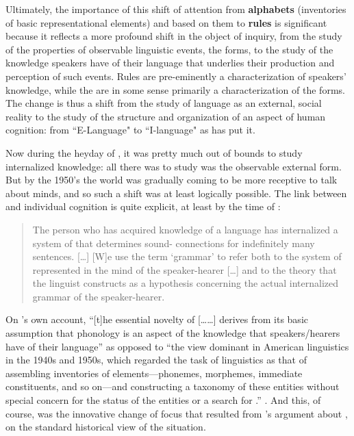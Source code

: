 Ultimately, the importance of this shift of attention from
\textbf{alphabets} (inventories of basic representational elements)
and  based on them to \textbf{rules} is significant
because it reflects a more profound shift in the object of inquiry,
from the study of the properties of observable linguistic events, the
forms, to the study of the knowledge speakers have of their language
that underlies their production and perception of such events. Rules
are pre-eminently a characterization of speakers' knowledge, while the
 are in some sense primarily a characterization of the
forms. The change is thus a shift from the study of language as an
external, social reality to the study of the structure and
organization of an aspect of human cognition: from ``E-Language" to
``I-language" as \citet{chomsky:knowledge} has put it.

Now during the heyday of , it was pretty much
out of bounds to study internalized knowledge: all there was to study
was the observable external form. But by the 1950's the world was
gradually coming to be more receptive to talk about minds, and so such
a shift was at least logically possible. The link between  and
individual cognition is quite explicit, at least by the time of
\textsl{}:

\begin{quotation}
  The person who has acquired knowledge of a
  language has internalized a system of  that determines
  sound- connections for indefinitely many sentences.
  {[\ldots]} {[W]}e use the term `grammar' to refer both to the system
  of  represented in the mind of the speaker-hearer {[\ldots]}
  and to the theory that the linguist constructs as a hypothesis
  concerning the actual internalized grammar of the speaker-hearer.\\
  \citep[3f.]{spe} 
\end{quotation}

On {\Halle}'s own account, ``[t]he essential novelty of
[\ldots\textsl{}\ldots] derives from its basic assumption that
phonology is an aspect of the knowledge that speakers/hearers have of
their language'' as opposed to ``the view dominant in American
linguistics in the 1940s and 1950s, which regarded the task of
linguistics as that of assembling inventories of elements---phonemes,
morphemes, immediate constituents, and so on---and constructing a
taxonomy of these entities without special concern for the status of
the entities or a search for .'' \citep[539]{halle:stress98}.
And this, of course, was the innovative change of focus that resulted
from {\Halle}'s argument about  , on the standard
historical view of the situation.
  
